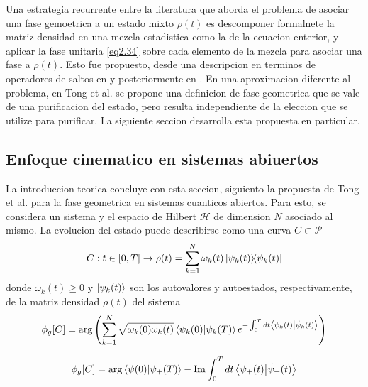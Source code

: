 Una estrategia recurrente entre la literatura que aborda el problema de asociar una fase gemoetrica a un estado mixto $\rho(t)$ es descomponer formalnete la matriz densidad en una mezcla estadistica como la de la ecuacion enterior, y aplicar la fase unitaria \ref{eq2.34} sobre cada elemento de la mezcla para asociar una fase a $\rho(t)$. Esto fue propuesto, desde una descripcion en terminos de operadores de saltos en \cite{32,33} y posteriormente en \cite{34-37}. En una aproximacion diferente al problema, en Tong et al. \cite{31} se propone una definicion de fase geometrica que se vale de una purificacion del estado, pero resulta independiente de la eleccion que se utilize para purificar. La siguiente seccion desarrolla esta propuesta en particular.
\subsection{Enfoque cinematico en sistemas abiuertos}
La introduccion teorica concluye con esta seccion, siguiento la propuesta de Tong et al. \cite{31} para la fase geometrica en sistemas cuanticos abiertos. Para esto, se considera un sistema y el espacio de Hilbert $\mathcal{H}$ de dimension $N$ asociado al mismo. La evolucion del estado puede describirse como una curva $C \subset \mathcal{P}$
\begin{equation}
    C:t\in[0,T] \rightarrow \rho(t) = \sum_{k=1}^N\omega_k(t)\ketbra{\psi_k(t)}{\psi_k(t)}
\end{equation}
donde $\omega_k(t)\geq 0$ y $\ket{\psi_k(t)}$ son los autovalores y autoestados, respectivamente, de la matriz densidad $\rho(t)$ del sistema
\begin{equation}
    \phi_g[C]=\arg \left( \sum_{k=1}^{N} \sqrt{\omega_k(0)\omega_k(t)} \braket{\psi_k(0)}{\psi_k(T)}e^{-\int_{0}^{T}dt\braket{\psi_k(t)}{\dot\psi_k(t)}} \right)
\end{equation}\label{ec2:fg general}

\begin{equation}
    \phi_g[C]=\arg{\braket{\psi(0)}{\psi_+(T)}}-\Im \int_{0}^{T}dt \braket{\psi_+(t)}{\dot\psi_+(t)}
\end{equation}\label{ec2:fg general puro}


